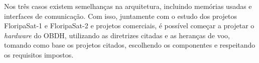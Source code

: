 Nos três casos existem semelhanças na arquitetura, incluindo memórias usadas e interfaces de comunicação. Com isso, juntamente com o estudo dos projetos FloripaSat-1 e FloripaSat-2 e projetos comerciais, é possível começar a projetar o \textit{hardware} do OBDH, utilizando as diretrizes citadas e as heranças de voo, tomando como base os projetos citados, escolhendo os componentes e respeitando os requisitos impostos.







 

